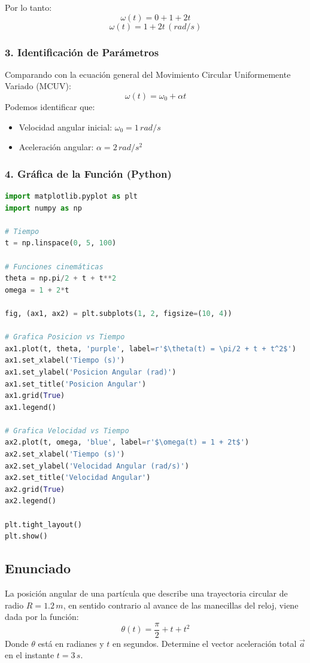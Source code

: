 \documentclass[12pt, a4paper]{article}
\begin{document}
Por lo tanto:
$$ \omega(t) = 0 + 1 + 2t $$
$$ \boxed{\omega(t) = 1 + 2t \, (\si{rad/s})} $$

\subsubsection*{3. Identificación de Parámetros}
Comparando con la ecuación general del Movimiento Circular Uniformemente Variado (MCUV):
$$ \omega(t) = \omega_0 + \alpha t $$
Podemos identificar que:
\begin{itemize}
    \item Velocidad angular inicial: $\omega_0 = 1 \, \si{rad/s}$
    \item Aceleración angular: $\alpha = 2 \, \si{rad/s^2}$
\end{itemize}

\subsubsection*{4. Gráfica de la Función (Python)}
\begin{lstlisting}[language=Python]
import matplotlib.pyplot as plt
import numpy as np

# Tiempo
t = np.linspace(0, 5, 100)

# Funciones cinemáticas
theta = np.pi/2 + t + t**2
omega = 1 + 2*t

fig, (ax1, ax2) = plt.subplots(1, 2, figsize=(10, 4))

# Grafica Posicion vs Tiempo
ax1.plot(t, theta, 'purple', label=r'$\theta(t) = \pi/2 + t + t^2$')
ax1.set_xlabel('Tiempo (s)')
ax1.set_ylabel('Posicion Angular (rad)')
ax1.set_title('Posicion Angular')
ax1.grid(True)
ax1.legend()

# Grafica Velocidad vs Tiempo
ax2.plot(t, omega, 'blue', label=r'$\omega(t) = 1 + 2t$')
ax2.set_xlabel('Tiempo (s)')
ax2.set_ylabel('Velocidad Angular (rad/s)')
ax2.set_title('Velocidad Angular')
ax2.grid(True)
ax2.legend()

plt.tight_layout()
plt.show()
\end{lstlisting}

\newpage

\subsection*{Enunciado}
La posición angular de una partícula que describe una trayectoria circular de radio $R = 1.2 \, \si{m}$, en sentido contrario al avance de las manecillas del reloj, viene dada por la función:
$$ \theta(t) = \frac{\pi}{2} + t + t^2 $$
Donde $\theta$ está en radianes y $t$ en segundos. Determine el vector aceleración total $\vec{a}$ en el instante $t = 3 \, \si{s}$.
\end{document}
